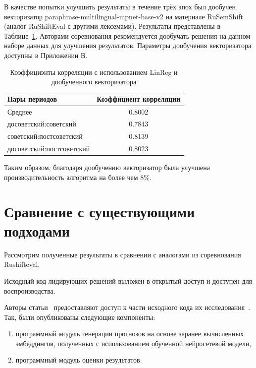 \documentclass[LI,VKR]{HSEUniversity}
\begin{document}
В качестве попытки улучшить результаты в течение трёх эпох
был дообучен векторизатор paraphrase-multilingual-mpnet-base-v2
на материале RuSemShift (аналог RuShiftEval с другими лексемами).
Результаты представлены в Таблице~\ref{tab:Rushifteval 2}.
Авторами соревнования рекомендуется дообучать решения на данном наборе данных для улучшения результатов.
Параметры дообучения векторизатора доступны в Приложении В.

\begin{table}[H]
\centering
\caption{Коэффициэнты корреляции с использованием LinReg и дообученного векторизатора}
\label{tab:Rushifteval 2}
\begin{tabular}{|l|c|}
\hline
\textbf{Пары периодов}                  & \textbf{Коэффициент корреляции} \\
\hline
Среднее            & 0.8002                  \\
\hline
досоветский:советский           & 0.7843                  \\
\hline
советский:постсоветский          & 0.8139                  \\
\hline
досоветский:постсоветский      & 0.8023                  \\
\hline
\end{tabular}
\end{table}

Таким образом, благодаря дообучению векторизатор была улучшена производительность алгоритма
на более чем 8\%.

\section{Сравнение с существующими подходами}

Рассмотрим полученные результаты в сравнении с аналогами из соревнования Rushifteval.

Исходный код лидирующих решений выложен в открытый доступ и доступен для воспроизводства.

Авторы статьи~\cite{GlossReader} предоставляют доступ к части исходного кода
их исследования~.
Так, были опубликованы следующие компоненты:
\begin{enumerate}
    \item программный модуль генерации прогнозов на основе заранее вычисленных эмбеддингов,
полученных с использованием обученной нейросетевой модели,
    \item программный модуль оценки результатов.
\end{enumerate}
\end{document}

